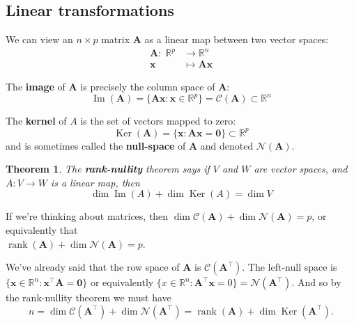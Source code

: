 \documentclass[
]{book}
\newtheorem{theorem}{Theorem}[chapter]
\theoremstyle{definition}
\theoremstyle{definition}
\theoremstyle{definition}
\theoremstyle{definition}
\theoremstyle{remark}
\begin{document}
\hypertarget{linear-transformations}{%
\subsection{Linear transformations}\label{linear-transformations}}

We can view an \(n\times p\) matrix \(\mathbf A\) as a linear map between two vector spaces:
\begin{align*}
\mathbf A: \;\mathbb{R}^p &\rightarrow   \mathbb{R}^n\\
 \mathbf x&\mapsto \mathbf A\mathbf x
\end{align*}

The \textbf{image} of \(\mathbf A\) is precisely the column space of \(\mathbf A\):
\[\operatorname{Im}(\mathbf A) = \{\mathbf A\mathbf x: \mathbf x\in \mathbb{R}^p\}=\mathcal{C}(\mathbf A) \subset \mathbb{R}^n\]

The \textbf{kernel} of \(A\) is the set of vectors mapped to zero:
\[\operatorname{Ker}(\mathbf A)=\{\mathbf x: \mathbf A\mathbf x={\boldsymbol 0}\}\subset \mathbb{R}^p\]
and is sometimes called the \textbf{null-space} of \(\mathbf A\) and denoted \(\mathcal{N}(\mathbf A)\).

\begin{theorem}
\protect\hypertarget{thm:ranknullity}{}\label{thm:ranknullity}The \textbf{rank-nullity} theorem says if \(V\) and \(W\) are vector spaces, and \(A: V\rightarrow W\) is a linear map, then
\[\dim \operatorname{Im}(A)+\dim \operatorname{Ker}(A) =\dim V\]
\end{theorem}

If we're thinking about matrices, then \(\dim \mathcal{C}(\mathbf A)+\dim \mathcal{N}(\mathbf A)=p\), or equivalently that\\
\(\operatorname{rank}(\mathbf A)+\dim \mathcal{N}(\mathbf A)=p\).

We've already said that the row space of \(\mathbf A\) is \(\mathcal{C}(\mathbf A^\top)\). The left-null space is \(\{\mathbf x\in \mathbb{R}^n: \mathbf x^\top \mathbf A={\boldsymbol 0}\}\) or equivalently \(\{x \in \mathbb{R}^n: \mathbf A^\top \mathbf x=0\}=\mathcal{N}(\mathbf A^\top)\). And so by the rank-nullity theorem we must have
\[n=\dim \mathcal{C}(\mathbf A^\top) + \dim \mathcal{N}(\mathbf A^\top)=
\operatorname{rank}(\mathbf A)+\dim \operatorname{Ker}(\mathbf A^\top).\]
\end{document}
